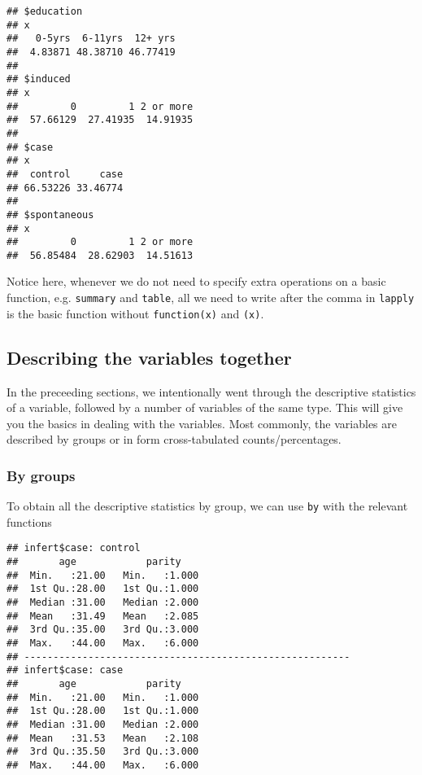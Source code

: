 \documentclass[]{book}
\newenvironment{Shaded}{\begin{snugshade}}{\end{snugshade}}
\newcommand{\KeywordTok}[1]{\textcolor[rgb]{0.13,0.29,0.53}{\textbf{#1}}}
\newcommand{\StringTok}[1]{\textcolor[rgb]{0.31,0.60,0.02}{#1}}
\newcommand{\OperatorTok}[1]{\textcolor[rgb]{0.81,0.36,0.00}{\textbf{#1}}}
\newcommand{\NormalTok}[1]{#1}
\theoremstyle{definition}
\theoremstyle{definition}
\theoremstyle{remark}
\begin{document}
\begin{verbatim}
## $education
## x
##   0-5yrs  6-11yrs  12+ yrs 
##  4.83871 48.38710 46.77419 
## 
## $induced
## x
##         0         1 2 or more 
##  57.66129  27.41935  14.91935 
## 
## $case
## x
##  control     case 
## 66.53226 33.46774 
## 
## $spontaneous
## x
##         0         1 2 or more 
##  56.85484  28.62903  14.51613
\end{verbatim}

Notice here, whenever we do not need to specify extra operations on a
basic function, e.g. \texttt{summary} and \texttt{table}, all we need to
write after the comma in \texttt{lapply} is the basic function without
\texttt{function(x)} and \texttt{(x)}.

\subsection{Describing the variables
together}\label{describing-the-variables-together}

In the preceeding sections, we intentionally went through the
descriptive statistics of a variable, followed by a number of variables
of the same type. This will give you the basics in dealing with the
variables. Most commonly, the variables are described by groups or in
form cross-tabulated counts/percentages.

\subsubsection{By groups}\label{by-groups}

To obtain all the descriptive statistics by group, we can use
\texttt{by} with the relevant functions

\begin{Shaded}
\end{Shaded}

\begin{verbatim}
## infert$case: control
##       age            parity     
##  Min.   :21.00   Min.   :1.000  
##  1st Qu.:28.00   1st Qu.:1.000  
##  Median :31.00   Median :2.000  
##  Mean   :31.49   Mean   :2.085  
##  3rd Qu.:35.00   3rd Qu.:3.000  
##  Max.   :44.00   Max.   :6.000  
## -------------------------------------------------------- 
## infert$case: case
##       age            parity     
##  Min.   :21.00   Min.   :1.000  
##  1st Qu.:28.00   1st Qu.:1.000  
##  Median :31.00   Median :2.000  
##  Mean   :31.53   Mean   :2.108  
##  3rd Qu.:35.50   3rd Qu.:3.000  
##  Max.   :44.00   Max.   :6.000
\end{verbatim}
\end{document}
